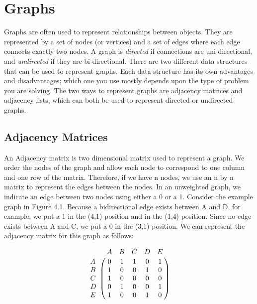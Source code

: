 \label{lab:SixDegreesKevinBacon}


\section*{Graphs}
Graphs are often used to represent relationships between objects. They are 
represented by a set of nodes (or vertices) and a set of edges where each edge
connects exactly two nodes.  A graph is \emph{directed} if connections are uni-directional,
and \emph{undirected} if they are bi-directional.
There are two different data structures that can be used to represent graphs.
Each data structure has its own advantages and disadvantages;
which one you use mostly depends upon the type of problem you are solving.
The two ways to represent graphs are adjacency matrices and adjacency lists, which can both be used to represent directed or undirected graphs.

\subsection*{Adjacency Matrices}
An Adjacency matrix is two dimensional matrix used to represent a graph. We order
the nodes of the graph and allow each node to correspond to one column and one
row of the matrix. Therefore, if we have n nodes, we use an n by n matrix to 
represent the edges between the nodes. In an unweighted graph, we indicate an 
edge between two nodes using either a 0 or a 1. 
Consider the example graph in Figure 4.1. Because a bidirectional edge exists between A and D, for example, we put a 1 in the (4,1) position and 
in the (1,4) position. Since no edge exists between A and C, we put a 0 in 
the (3,1) position. We can represent the adjacency matrix for this graph as follows:

\[
\bordermatrix{\hspace{.4cm}&A&B&C&D&E\cr
                A&0 & 1 & 1 & 0 & 1\cr
                B& 1 & 0 & 0 & 1 & 0\cr
                C& 1 & 0 & 0 & 0 & 0\cr
                D& 0 & 1 & 0 & 0 & 1\cr
                E& 1 & 0 & 0 & 1 & 0}\]

